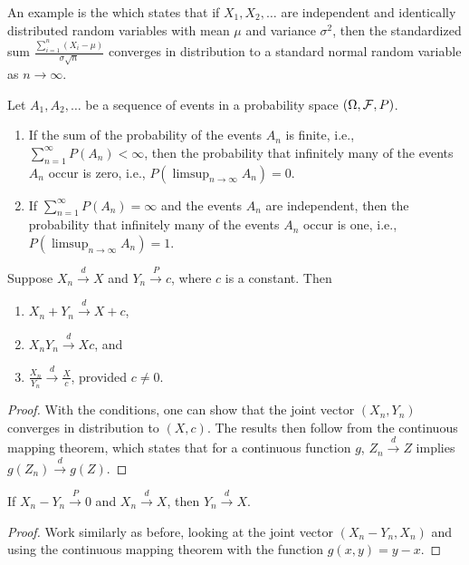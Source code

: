 An example is the  which states that if $X_{1}, X_{2}, \ldots$ are independent and identically distributed random variables with mean $\mu$ and variance $\sigma^{2}$, then the standardized sum $\frac{\sum_{i=1}^{n} (X_{i} - \mu)}{\sigma \sqrt{n}}$ converges in distribution to a standard normal random variable as $n \to \infty$.

\begin{lemma}
    Let $A_{1},A_{2},\ldots$ be a sequence of events in a probability space $(\Omega, \mathcal{F}, P)$.
    \begin{enumerate}
        \item If the sum of the probability of the events $A_{n}$ is finite, i.e., $\sum_{n=1}^{\infty} P(A_{n}) < \infty$, then the probability that infinitely many of the events $A_{n}$ occur is zero, i.e., $P(\limsup_{n \to \infty} A_{n}) = 0$.
        \item If $\sum_{n=1}^{\infty} P(A_{n}) = \infty$ and the events $A_{n}$ are independent, then the probability that infinitely many of the events $A_{n}$ occur is one, i.e., $P(\limsup_{n \to \infty} A_{n}) = 1$.
    \end{enumerate}
\end{lemma}

\begin{theorem}
    Suppose $X_{n} \xrightarrow{d} X$ and $Y_{n} \xrightarrow{P} c$, where $c$ is a constant. Then
    \begin{enumerate}
        \item $X_{n} + Y_{n} \xrightarrow{d} X + c$,
        \item $X_{n}Y_{n} \xrightarrow{d} Xc$, and
        \item $\frac{X_{n}}{Y_{n}} \xrightarrow{d} \frac{X}{c}$, provided $c \neq 0$.
    \end{enumerate}
\end{theorem}

\begin{proof}
    With the conditions, one can show that the joint vector $(X_{n}, Y_{n})$ converges in distribution to $(X, c)$. The results then follow from the continuous mapping theorem, which states that for a continuous function $g$, $Z_{n} \xrightarrow{d} Z$ implies $g(Z_{n}) \xrightarrow{d} g(Z)$.
\end{proof}

\begin{corollary}
    If $X_{n} - Y_{n} \xrightarrow{P} 0$ and $X_{n} \xrightarrow{d} X$, then $Y_{n} \xrightarrow{d} X$.
\end{corollary}
\begin{proof}
    Work similarly as before, looking at the joint vector $(X_{n}-Y_{n},X_{n})$ and using the continuous mapping theorem with the function $g(x,y) = y - x$.
\end{proof}

